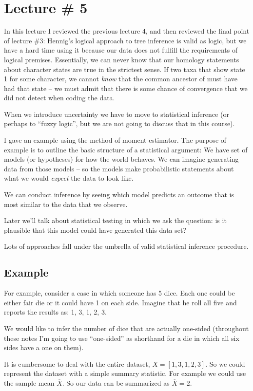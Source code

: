 \documentclass[11pt]{article}
\begin{document}
\section*{Lecture \# 5 }
In this lecture I reviewed the previous lecture 4, and then reviewed the final point of lecture \#3: Hennig's logical approach to tree inference is valid as logic, but we have a hard time using it because our data does not fulfill the requirements of logical premises.  Essentially, we can never know that our homology statements about character states are true in the strictest sense. If two taxa that show state 1 for some character, we cannot {\em know} that the common ancestor of must have had that state -- we must admit that there is some chance of convergence that we did not detect when coding the data.

When we introduce uncertainty we have to move to statistical inference (or perhaps to ``fuzzy logic'', but we are not going to discuss that in this course).

I gave an example using the method of moment estimator.  The purpose of example is to outline the basic structure of a statistical argument: We have set of models (or hypotheses) for how the world behaves.
We can imagine generating data from those models -- so the models make probabilistic statements about what we would {\em expect} the data to look like.

We can conduct inference by seeing which model predicts an outcome that is most similar to the data that we observe.

Later we'll talk about statistical testing in which we ask the question: is it plausible that this model could have generated this data set?

Lots of approaches fall under the umbrella of valid statistical inference procedure.

\subsection*{Example}
For example, consider a case in which someone has 5 dice. Each one could be either fair die or it could have 1 on each side.  Imagine that he roll all five and reports the results as: 1, 3, 1, 2, 3.

We would like to infer the number of dice that are actually one-sided (throughout these notes I'm going to use ``one-sided'' as shorthand for a die in which all six sides have a one on them).

It is cumbersome to deal with the entire dataset, $X = [1, 3, 1, 2, 3]$.  So we could represent the dataset with a simple summary statistic.  For example we could use the sample mean $\overline{X}$.  So our data can be summarized as  $\overline{X}=2$.
\end{document}
